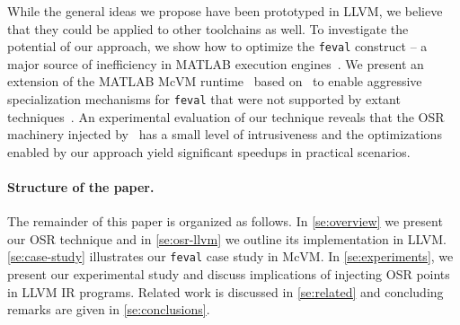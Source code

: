 
\noindent While the general ideas we propose have been prototyped in LLVM, we believe that they could be applied to other toolchains as well. To investigate the potential of our approach, we show how to optimize the {\tt feval} construct -- a major source of inefficiency in MATLAB execution engines~\cite{lameed2013feval, radpour2013refactoring}. We present an extension of the MATLAB McVM runtime~\cite{chevalier2010mcvm} based on \osrkit\ to enable aggressive specialization mechanisms for {\tt feval} that were not supported by extant techniques~\cite{lameed2013feval}. An experimental evaluation of our technique reveals that the OSR machinery injected by \osrkit\ has a small level of intrusiveness and the optimizations enabled by our approach yield significant speedups in practical scenarios.



\paragraph{Structure of the paper.}
The remainder of this paper is organized as follows. In \mysection\ref{se:overview} we present our OSR technique and in \mysection\ref{se:osr-llvm} we outline its implementation in LLVM. \mysection\ref{se:case-study} illustrates our {\tt feval} case study in McVM. In \mysection\ref{se:experiments}, we present our experimental study and discuss implications of injecting OSR points in LLVM IR programs. Related work is discussed in \mysection\ref{se:related} and concluding remarks are given in \mysection\ref{se:conclusions}. %
